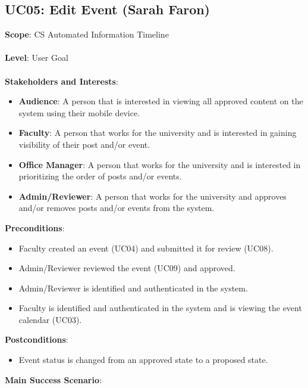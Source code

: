 \documentclass{article}
\begin{document}
\subsection{\textbf{UC05}: Edit Event (Sarah Faron)}
\textbf{Scope}: CS Automated Information Timeline\\
\\
    \textbf{Level}: User Goal\\
    \\
    \textbf{Stakeholders and Interests}:
    \begin{itemize}[label={}]
        \item \textbf{Audience}: A person that is interested in viewing all approved content on the system using their mobile device.
         \item \textbf{Faculty}: A person that works for the university and is interested in gaining visibility of their post and/or event.
         \item \textbf{Office Manager}: A person that works for the university and is interested in prioritizing the order of posts and/or events. 
          \item \textbf{Admin/Reviewer}: A person that works for the university and approves and/or removes posts and/or events from the system. 
    \end{itemize}
    \textbf{Preconditions}:
    \begin{itemize}[label={}]
        \item Faculty created an event (UC04) and submitted it for review (UC08).
        \item Admin/Reviewer reviewed the event (UC09) and approved.
        \item Admin/Reviewer is identified and authenticated in the system.
        \item Faculty is identified and authenticated in the system and is viewing the event calendar (UC03).
    \end{itemize}
    \textbf{Postconditions}:
        \begin{itemize}[label={}]
        \item Event status is changed from an approved state to a proposed state. 
    \end{itemize}
    \textbf{Main Success Scenario}:
\end{document}
